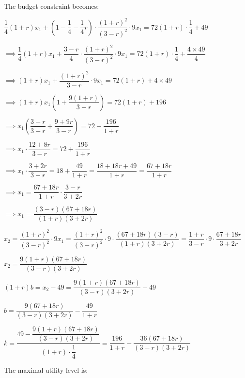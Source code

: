 \documentclass{article}
\begin{document}
The budget constraint becomes:

$\dfrac{1}{4}\left(1+r\right)x_{1}+\left(1-\dfrac{1}{4}-\dfrac{1}{4}r\right)\cdot\dfrac{\left(1+r\right)^{2}}{\left(3-r\right)^{2}}\cdot9x_{1}=72\left(1+r\right)\cdot\dfrac{1}{4}+49$

$\implies \dfrac{1}{4}\left(1+r\right)x_{1}+\dfrac{3-r}{4}\cdot\dfrac{\left(1+r\right)^{2}}{\left(3-r\right)^{2}}\cdot9x_{1}=72\left(1+r\right)\cdot\dfrac{1}{4}+\dfrac{4\times49}{4}$

$\implies \left(1+r\right)x_{1}+\dfrac{\left(1+r\right)^{2}}{3-r}\cdot9x_{1}=72\left(1+r\right)+4\times49$

$\implies \left(1+r\right)x_{1}\left(1+\dfrac{9\left(1+r\right)}{3-r}\right)=72\left(1+r\right)+196$

$\implies x_{1}\left(\dfrac{3-r}{3-r}+\dfrac{9+9r}{3-r}\right)=72+\dfrac{196}{1+r}$

$\implies x_{1}\cdot\dfrac{12+8r}{3-r}=72+\dfrac{196}{1+r}$

$\implies x_{1}\cdot\dfrac{3+2r}{3-r}=18+\dfrac{49}{1+r}=\dfrac{18+18r+49}{1+r}=\dfrac{67+18r}{1+r}$

$\implies x_{1}=\dfrac{67+18r}{1+r}\cdot\dfrac{3-r}{3+2r}$

$\implies x_{1}=\dfrac{\left(3-r\right)\left(67+18r\right)}{\left(1+r\right)\left(3+2r\right)}$

$x_{2}=\dfrac{\left(1+r\right)^{2}}{\left(3-r\right)^{2}}\cdot9x_{1}=\dfrac{\left(1+r\right)^{2}}{\left(3-r\right)^{2}}\cdot9\cdot\dfrac{\left(67+18r\right)\left(3-r\right)}{\left(1+r\right)\left(3+2r\right)}=\dfrac{1+r}{3-r}\cdot9\cdot\dfrac{67+18r}{3+2r}$

$x_{2}=\dfrac{9\left(1+r\right)\left(67+18r\right)}{\left(3-r\right)\left(3+2r\right)}$

$\left(1+r\right)b=x_{2}-49=\dfrac{9\left(1+r\right)\left(67+18r\right)}{\left(3-r\right)\left(3+2r\right)}-49$

$b=\dfrac{9\left(67+18r\right)}{\left(3-r\right)\left(3+2r\right)}-\dfrac{49}{1+r}$

$k=\dfrac{49-\dfrac{9\left(1+r\right)\left(67+18r\right)}{\left(3-r\right)\left(3+2r\right)}}{\left(1+r\right)\cdot\dfrac{1}{4}}=\dfrac{196}{1+r}-\dfrac{36\left(67+18r\right)}{\left(3-r\right)\left(3+2r\right)}$

The maximal utility level is:
\end{document}

